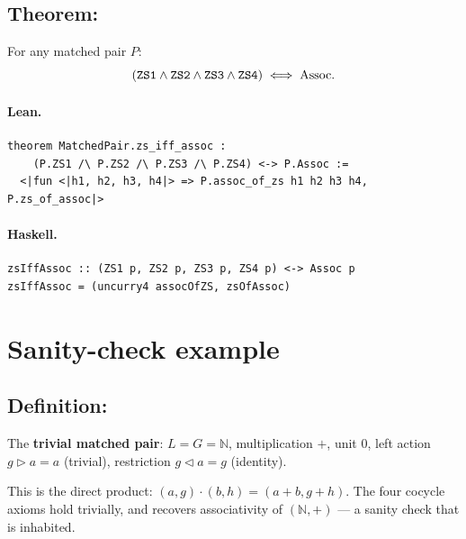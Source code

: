 \documentclass[11pt,a4paper]{article}
\begin{document}
\subsection{Theorem: }

\begin{thm}
For any matched pair $P$:
\[
  (\texttt{ZS1} \wedge \texttt{ZS2} \wedge \texttt{ZS3} \wedge \texttt{ZS4})
  \;\Longleftrightarrow\;
  \mathrm{Assoc}.
\]
\end{thm}

\paragraph{Lean.}
\begin{lstlisting}[style=lean]
theorem MatchedPair.zs_iff_assoc :
    (P.ZS1 /\ P.ZS2 /\ P.ZS3 /\ P.ZS4) <-> P.Assoc :=
  <|fun <|h1, h2, h3, h4|> => P.assoc_of_zs h1 h2 h3 h4, P.zs_of_assoc|>
\end{lstlisting}

\paragraph{Haskell.}
\begin{lstlisting}[style=haskell]
zsIffAssoc :: (ZS1 p, ZS2 p, ZS3 p, ZS4 p) <-> Assoc p
zsIffAssoc = (uncurry4 assocOfZS, zsOfAssoc)
\end{lstlisting}


\section{Sanity-check example}

\subsection{Definition: }

\begin{defn}
The \textbf{trivial matched pair}: $L = G = \mathbb{N}$, multiplication $+$, unit
$0$, left action $g \triangleright a = a$ (trivial), restriction
$g \triangleleft a = g$ (identity).

This is the direct product: $(a,g) \cdot (b,h) = (a + b, g + h)$.
The four cocycle axioms hold trivially, and  recovers
associativity of $(\mathbb{N}, +)$ --- a sanity check that  is
inhabited.
\end{defn}
\end{document}
